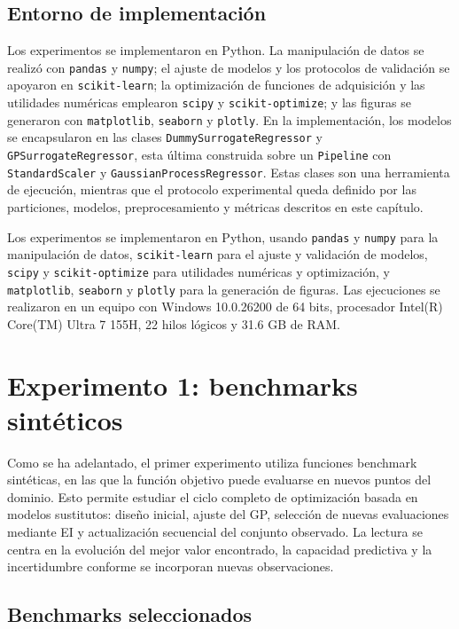 \subsection{Entorno de implementación}\label{subsubsec:entorno_implementacion}

Los experimentos se implementaron en Python. La manipulación de datos se realizó con \texttt{pandas} y \texttt{numpy}; el ajuste de modelos y los protocolos de validación se apoyaron en \texttt{scikit-learn}; la optimización de funciones de adquisición y las utilidades numéricas emplearon \texttt{scipy} y \texttt{scikit-optimize}; y las figuras se generaron con \texttt{matplotlib}, \texttt{seaborn} y \texttt{plotly}. En la implementación, los modelos se encapsularon en las clases \texttt{DummySurrogateRegressor} y \texttt{GPSurrogateRegressor}, esta última construida sobre un \texttt{Pipeline} con \texttt{StandardScaler} y \texttt{GaussianProcessRegressor}. Estas clases son una herramienta de ejecución, mientras que el protocolo experimental queda definido por las particiones, modelos, preprocesamiento y métricas descritos en este capítulo.

Los experimentos se implementaron en Python, usando \texttt{pandas} y \texttt{numpy} para la manipulación de datos, \texttt{scikit-learn} para el ajuste y validación de modelos, \texttt{scipy} y \texttt{scikit-optimize} para utilidades numéricas y optimización, y \texttt{matplotlib}, \texttt{seaborn} y \texttt{plotly} para la generación de figuras. Las ejecuciones se realizaron en un equipo con Windows 10.0.26200 de 64 bits, procesador Intel(R) Core(TM) Ultra 7 155H, 22 hilos lógicos y 31.6 GB de RAM.

\section{Experimento 1: benchmarks sintéticos}\label{subsec:experimento_benchmarks}

Como se ha adelantado, el primer experimento utiliza funciones benchmark sintéticas, en las que la función objetivo puede evaluarse en nuevos puntos del dominio. Esto permite estudiar el ciclo completo de optimización basada en modelos sustitutos: diseño inicial, ajuste del GP, selección de nuevas evaluaciones mediante EI y actualización secuencial del conjunto observado. La lectura se centra en la evolución del mejor valor encontrado, la capacidad predictiva y la incertidumbre conforme se incorporan nuevas observaciones.

\subsection{Benchmarks seleccionados}\label{subsubsec:benchmarks_seleccionados}


